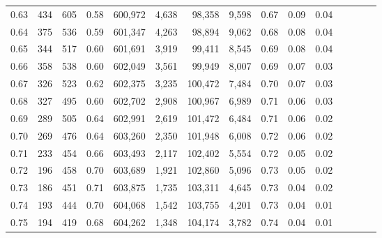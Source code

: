 \begin{tabular}{rrrcrrrrrrrrrrr}
0.63 &     434 &    605 &                                       0.58 &  600,972 &    4,638 &   98,358 &    9,598 &  0.67 &  0.09 &                         0.04 \\
0.64 &     375 &    536 &                                       0.59 &  601,347 &    4,263 &   98,894 &    9,062 &  0.68 &  0.08 &                         0.04 \\
0.65 &     344 &    517 &                                       0.60 &  601,691 &    3,919 &   99,411 &    8,545 &  0.69 &  0.08 &                         0.04 \\
0.66 &     358 &    538 &                                       0.60 &  602,049 &    3,561 &   99,949 &    8,007 &  0.69 &  0.07 &                         0.03 \\
0.67 &     326 &    523 &                                       0.62 &  602,375 &    3,235 &  100,472 &    7,484 &  0.70 &  0.07 &                         0.03 \\
0.68 &     327 &    495 &                                       0.60 &  602,702 &    2,908 &  100,967 &    6,989 &  0.71 &  0.06 &                         0.03 \\
0.69 &     289 &    505 &                                       0.64 &  602,991 &    2,619 &  101,472 &    6,484 &  0.71 &  0.06 &                         0.02 \\
0.70 &     269 &    476 &                                       0.64 &  603,260 &    2,350 &  101,948 &    6,008 &  0.72 &  0.06 &                         0.02 \\
0.71 &     233 &    454 &                                       0.66 &  603,493 &    2,117 &  102,402 &    5,554 &  0.72 &  0.05 &                         0.02 \\
0.72 &     196 &    458 &                                       0.70 &  603,689 &    1,921 &  102,860 &    5,096 &  0.73 &  0.05 &                         0.02 \\
0.73 &     186 &    451 &                                       0.71 &  603,875 &    1,735 &  103,311 &    4,645 &  0.73 &  0.04 &                         0.02 \\
0.74 &     193 &    444 &                                       0.70 &  604,068 &    1,542 &  103,755 &    4,201 &  0.73 &  0.04 &                         0.01 \\
0.75 &     194 &    419 &                                       0.68 &  604,262 &    1,348 &  104,174 &    3,782 &  0.74 &  0.04 &                         0.01 \\

\end{tabular}
